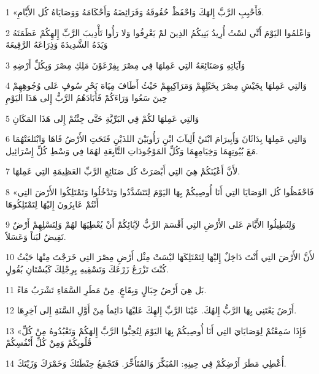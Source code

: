 \par 1 «فَأَحْبِبِ الرَّبَّ إِلهَكَ وَاحْفَظْ حُقُوقَهُ وَفَرَائِضَهُ وَأَحْكَامَهُ وَوَصَايَاهُ كُل الأَيَّامِ.
\par 2 وَاعْلمُوا اليَوْمَ أَنِّي لسْتُ أُرِيدُ بَنِيكُمُ الذِينَ لمْ يَعْرِفُوا وَلا رَأُوا تَأْدِيبَ الرَّبِّ إِلهِكُمْ عَظَمَتَهُ وَيَدَهُ الشَّدِيدَةَ وَذِرَاعَهُ الرَّفِيعَةَ
\par 3 وَآيَاتِهِ وَصَنَائِعَهُ التِي عَمِلهَا فِي مِصْرَ بِفِرْعَوْنَ مَلِكِ مِصْرَ وَبِكُلِّ أَرْضِهِ
\par 4 وَالتِي عَمِلهَا بِجَيْشِ مِصْرَ بِخَيْلِهِمْ وَمَرَاكِبِهِمْ حَيْثُ أَطَافَ مِيَاهَ بَحْرِ سُوفٍ عَلى وُجُوهِهِمْ حِينَ سَعُوا وَرَاءَكُمْ فَأَبَادَهُمُ الرَّبُّ إِلى هَذَا اليَوْمِ
\par 5 وَالتِي عَمِلهَا لكُمْ فِي البَرِّيَّةِ حَتَّى جِئْتُمْ إِلى هَذَا المَكَانِ
\par 6 وَالتِي عَمِلهَا بِدَاثَانَ وَأَبِيرَامَ ابْنَيْ أَلِيآبَ ابْنِ رَأُوبَيْنَ اللذَيْنِ فَتَحَتِ الأَرْضُ فَاهَا وَابْتَلعَتْهُمَا مَعَ بُيُوتِهِمَا وَخِيَامِهِمَا وَكُلِّ المَوْجُودَاتِ التَّابِعَةِ لهُمَا فِي وَسْطِ كُلِّ إِسْرَائِيل.
\par 7 لأَنَّ أَعْيُنَكُمْ هِيَ التِي أَبْصَرَتْ كُل صَنَائِعِ الرَّبِّ العَظِيمَةِ التِي عَمِلهَا.
\par 8 «فَاحْفَظُوا كُل الوَصَايَا التِي أَنَا أُوصِيكُمْ بِهَا اليَوْمَ لِتَتَشَدَّدُوا وَتَدْخُلُوا وَتَمْتَلِكُوا الأَرْضَ التِي أَنْتُمْ عَابِرُونَ إِليْهَا لِتَمْتَلِكُوهَا
\par 9 وَلِتُطِيلُوا الأَيَّامَ عَلى الأَرْضِ التِي أَقْسَمَ الرَّبُّ لآِبَائِكُمْ أَنْ يُعْطِيَهَا لهُمْ وَلِنَسْلِهِمْ أَرْضٌ تَفِيضُ لبَناً وَعَسَلاً.
\par 10 لأَنَّ الأَرْضَ التِي أَنْتَ دَاخِلٌ إِليْهَا لِتَمْتَلِكَهَا ليْسَتْ مِثْل أَرْضِ مِصْرَ التِي خَرَجْتَ مِنْهَا حَيْثُ كُنْتَ تَزْرَعُ زَرْعَكَ وَتَسْقِيهِ بِرِجْلِكَ كَبُسْتَانِ بُقُولٍ.
\par 11 بَل هِيَ أَرْضُ جِبَالٍ وَبِقَاعٍ. مِنْ مَطَرِ السَّمَاءِ تَشْرَبُ مَاءً.
\par 12 أَرْضٌ يَعْتَنِي بِهَا الرَّبُّ إِلهُكَ. عَيْنَا الرَّبِّ إِلهِكَ عَليْهَا دَائِماً مِنْ أَوَّلِ السَّنَةِ إِلى آخِرِهَا.
\par 13 «فَإِذَا سَمِعْتُمْ لِوَصَايَايَ التِي أَنَا أُوصِيكُمْ بِهَا اليَوْمَ لِتُحِبُّوا الرَّبَّ إِلهَكُمْ وَتَعْبُدُوهُ مِنْ كُلِّ قُلُوبِكُمْ وَمِنْ كُلِّ أَنْفُسِكُمْ
\par 14 أُعْطِي مَطَرَ أَرْضِكُمْ فِي حِينِهِ: المُبَكِّرَ وَالمُتَأَخِّرَ. فَتَجْمَعُ حِنْطَتَكَ وَخَمْرَكَ وَزَيْتَكَ.
